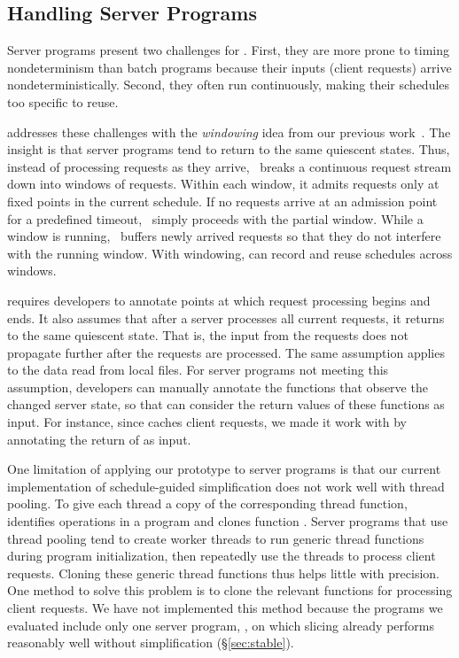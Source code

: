 \subsection{Handling Server Programs} \label{sec:window}

Server programs present two challenges for \peregrine.  First, they are more
prone to timing nondeterminism than batch programs because their inputs
(client requests) arrive nondeterministically.  Second, they often run
continuously, making their schedules too specific to reuse.  

\peregrine addresses these challenges with the \emph{windowing} idea from our
previous work~\cite{cui:tern:osdi10}.  The insight is that server programs
tend to return to the same quiescent states.  Thus, instead of processing
requests as they arrive, \peregrine\ breaks a continuous request stream down into
windows of requests.  Within each window, it admits requests only at fixed
points in the current schedule.  If no requests arrive at an admission
point for a predefined timeout, \peregrine\ simply proceeds with the partial
window.  While a window is running, \peregrine\ buffers newly arrived requests
so that they do not interfere with the running window.  With windowing,
\peregrine can record and reuse schedules across windows.

\peregrine requires developers to annotate points at which request processing begins and
ends.  It also assumes that after a server processes all current requests,
it returns to the same quiescent state.  That is, the input from
the requests does not propagate further after the requests are processed.
The same assumption applies to the data read from local files.
For server programs not meeting this assumption, developers can manually
annotate the functions that observe the changed server state, so that \peregrine
can consider the return values of these functions as input.
For instance, since \apache caches client requests, we made it work with \peregrine
by annotating the return of  as input.

One limitation of applying our \peregrine prototype to server programs is that our current
implementation of schedule-guided simplification does not work well with
thread pooling.  To give each thread a copy of the corresponding thread
function, \peregrine identifies  operations in
a program and clones function .  Server programs that use
thread pooling tend to create worker threads to run generic thread
functions during program initialization, then repeatedly use the threads
to process client requests.  Cloning these generic thread functions thus
helps little with precision.  One method to solve this problem is to clone
the relevant functions for processing client requests.  We have not
implemented this method because the programs we evaluated include only one server
program, \apache, on which slicing already performs reasonably well
without simplification (\S\ref{sec:stable}).


